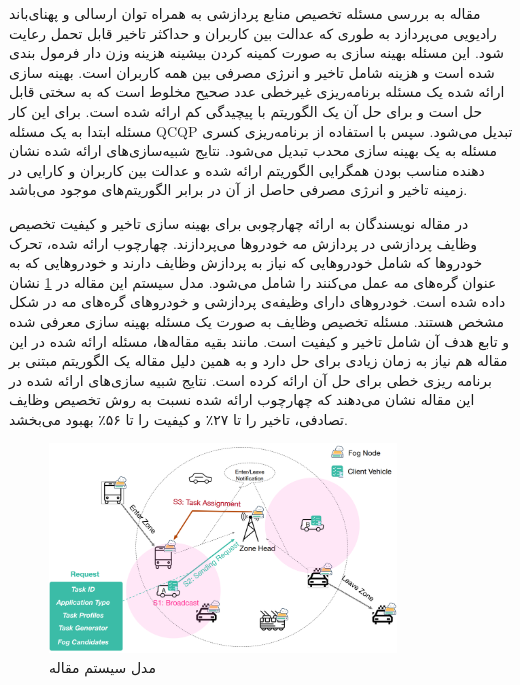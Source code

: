     مقاله \cite{du2018computation} به بررسی مسئله تخصیص منابع پردازشی به همراه توان ارسالی و پهنای‌باند رادیویی می‌پردازد به طوری که عدالت بین کاربران و حداکثر تاخیر قابل تحمل رعایت شود.
    این مسئله بهینه سازی به صورت کمینه کردن بیشینه هزینه وزن دار فرمول بندی شده است و هزینه شامل تاخیر و انرژی مصرفی بین همه کاربران است.
    بهینه سازی ارائه شده یک مسئله برنامه‌ریزی غیرخطی عدد صحیح مخلوط است که به سختی قابل حل است و برای حل آن یک الگوریتم با پیچیدگی کم ارائه شده است.
    برای این کار مسئله ابتدا به یک مسئله QCQP تبدیل می‌شود.
    سپس با استفاده از برنامه‌ریزی کسری مسئله به یک بهینه سازی محدب تبدیل می‌شود.
    نتایج شبیه‌سازی‌های ارائه شده نشان دهنده مناسب بودن همگرایی الگوریتم ارائه شده و عدالت بین کاربران و کارایی در زمینه تاخیر و انرژی مصرفی حاصل از آن در برابر الگوریتم‌های موجود می‌باشد.

    در مقاله \cite{zhu2018folo} نویسندگان به ارائه چهارچوبی برای بهینه سازی تاخیر و کیفیت تخصیص وظایف پردازشی در پردازش مه خودرو‌ها می‌پردازند.
    چهارچوب ارائه شده، تحرک خودرو‌ها که شامل خودرو‌هایی که نیاز به پردازش وظایف دارند و خودرو‌هایی که به عنوان گره‌های مه عمل می‌کنند را شامل می‌شود.
    مدل سیستم این مقاله در \cref{fig:chapter_2:system_model_zhu2018folo} نشان داده شده است.
    خودرو‌های دارای وظیفه‌ی پردازشی و خودرو‌های گره‌های مه در شکل مشخص هستند.
    مسئله تخصیص وظایف به صورت یک مسئله بهینه سازی معرفی شده و تابع هدف آن شامل تاخیر و کیفیت است.
    مانند بقیه مقاله‌ها، مسئله ارائه شده در این مقاله هم نیاز به زمان زیادی برای حل دارد و به همین دلیل مقاله یک الگوریتم مبتنی بر برنامه ریزی خطی برای حل آن ارائه کرده است.
    نتایج شبیه سازی‌های ارائه شده در این مقاله نشان می‌دهند که چهارچوب ارائه شده نسبت به روش تخصیص وظایف تصادفی، تاخیر را تا ۲۷٪ و کیفیت را تا ۵۶٪ بهبود می‌بخشد.

    \begin{figure}[h]
      \centerline{\includegraphics[width=9.2cm]{graphics/chapter_2/system_model_zhu2018folo}}
      \caption{مدل سیستم مقاله \cite{zhu2018folo}}
      \label{fig:chapter_2:system_model_zhu2018folo}
    \end{figure}

